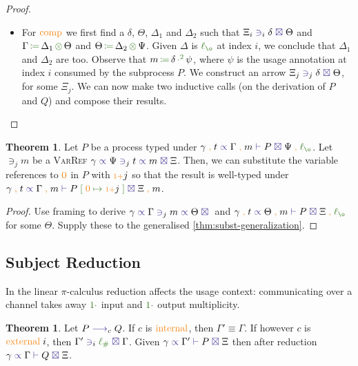 \documentclass[a4paper,UKenglish,cleveref,autoref,thm-restate,authorcolumns]{lipics-v2019}
\theoremstyle{definition}
\newtheorem{nitheorem}[theorem]{Theorem}
\newcommand{\picalc}{$\pi$-calculus}
\newcommand{\type}[1]{\textcolor{BlueViolet}{\operatorname{#1}}}
\newcommand{\constr}[1]{\textcolor{BurntOrange}{\operatorname{#1}}}
\newcommand{\func}[1]{\textcolor{OliveGreen}{\operatorname{#1}}}
\newcommand{\suc}{\constr{\scriptstyle 1+}}
\newcommand{\comma}{\; \constr{,} \;}
\newcommand{\subst}[3]{#1 \; \func{[} \; #3 \; \func{\mapsto} \;#2 \; \func{]}}
\newcommand{\opsquared}[3]{#1 \, \func{\coloneqq} \, #2 \, \func{\cdot^2} \, #3}
\newcommand{\opctx}[3]{#1 \, \func{\coloneqq} \, #2 \, \func{\otimes} \, #3}
\newcommand{\one}{\func{1\cdot}}
\newcommand{\lz}{\func{\ell_{\o}}}
\newcommand{\lio}{\func{\ell_{\#}}}
\newcommand{\reduce}[1]{\; \type{\longrightarrow}_{#1} \;}
\newcommand{\types}[4]{#1 \; \type{\propto} \; #2 \; \type{\vdash} \; #3 \; \type{\boxtimes} \; #4}
\newcommand{\contains}[6]{#1 \; \type{\propto} \; #2 \; \type{\ni}_{#3} \; #4 \; \type{\propto} \; #5 \; \type{\boxtimes} \; #6}
\newcommand{\containsusage}[4]{#1 \; \type{\ni}_{#2} \; #3 \; \type{\boxtimes} \; #4}
\begin{document}
\begin{proof}
\begin{itemize}
    \item
      For $\constr{comp}$ we first find a $\delta$, $\Theta$, $\Delta_1$ and $\Delta_2$ such that $\containsusage{\Xi_i}{i}{\delta}{\Theta}$ and $\opctx{\Gamma}{\Delta_1}{\Theta}$ and $\opctx{\Theta}{\Delta_2}{\Psi}$.
      Given $\Delta$ is $\lz$ at index $i$, we conclude that $\Delta_1$ and $\Delta_2$ are too.
      Observe that $\opsquared{m}{\delta}{\psi}$, where $\psi$ is the usage annotation at index $i$ consumed by the subprocess $P$.
      We construct an arrow $\containsusage{\Xi_j}{j}{\delta}{\Theta}$, for some $\Xi_j$.
      We can now make two inductive calls (on the derivation of $P$ and $Q$) and compose their results.
  \end{itemize}  
\end{proof}


\begin{nitheorem}
  \label{thm:substitution}
  Let $P$ be a process typed under $\types{\gamma \comma t}{\Gamma \comma m}{P}{\Psi \comma \lz}$.
  Let $\ni_j m$ be a \textsc{VarRef} $\contains{\gamma}{\Psi}{j}{t}{m}{\Xi}$.
  Then, we can substitute the variable references to $\constr{0}$ in $P$ with $\suc j$ so that the result is well-typed under $\types{\gamma \comma t}{\Gamma \comma m}{\subst{P}{\suc j}{\constr{0}}}{\Xi \comma m}$.
\end{nitheorem}
\begin{proof}
  Use framing to derive $\contains{\gamma}{\Gamma}{j}{m}{\Theta}$ and $\types{\gamma \comma t}{\Theta \comma m}{P}{\Xi \comma \lz}$ for some $\Theta$.
  Supply these to the generalised \autoref{thm:subst-generalization}.
\end{proof}

\subsection{Subject Reduction}
\label{subject-reduction}

In the linear \picalc{} reduction affects the usage context: communicating over a channel takes away $\one$ input and $\one$ output multiplicity.

\begin{nitheorem}
  Let $P \reduce{c} Q$.
  If $c$ is $\constr{internal}$, then $\Gamma' \equiv \Gamma$.
  If however $c$ is $\constr{external}\; i$, then $\containsusage{\Gamma'}{i}{\lio}{\Gamma}$.
  Given $\types{\gamma}{\Gamma'}{P}{\Xi}$ then after reduction $\types{\gamma}{\Gamma}{Q}{\Xi}$.
\end{nitheorem}
\end{document}
